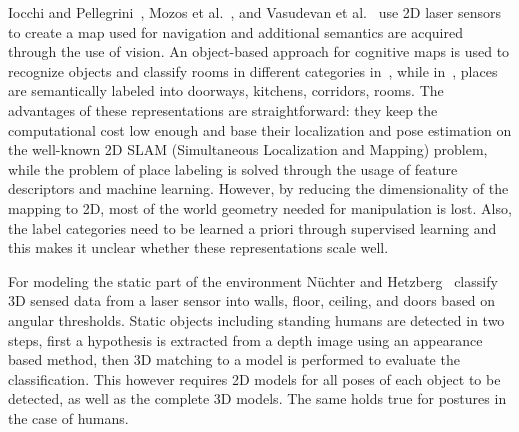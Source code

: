 
Iocchi and Pellegrini~\cite{IocchiISPRS}, Mozos et
al.~\cite{MartinezMozos07a}, and Vasudevan et
al.~\cite{vasudevan07cognitive} use 2D laser sensors to create a map
used for navigation and additional semantics are acquired through the
use of vision. An object-based approach for cognitive maps is used to
recognize objects and classify rooms in different categories
in~\cite{vasudevan07cognitive}, while
in~\cite{Mozos2006iros,MartinezMozos07a}, places are semantically
labeled into doorways, kitchens, corridors, rooms.  The advantages of
these representations are straightforward: they keep the computational
cost low enough and base their localization and pose estimation on the
well-known 2D SLAM (Simultaneous Localization and Mapping) problem,
while the problem of place labeling is solved through the usage of
feature descriptors and machine learning.  However, by reducing the
dimensionality of the mapping to 2D, most of the world geometry needed
for manipulation is lost.  Also, the label categories need to be
learned a priori through supervised learning and this makes it unclear
whether these representations scale well.


For modeling the static part of the environment N\"uchter and
Hetzberg~\cite{nuechter08semanticmaps} classify 3D sensed data from a
laser sensor into walls, floor, ceiling, and doors based on angular
thresholds. Static objects including standing humans are detected
in two steps, first a hypothesis is extracted from a depth image
using an appearance based method, then 3D matching to a model is
performed to evaluate the classification. This however requires 2D
models for all poses of each object to be detected, as well as the
complete 3D models. The same holds true for postures in the case of humans.

